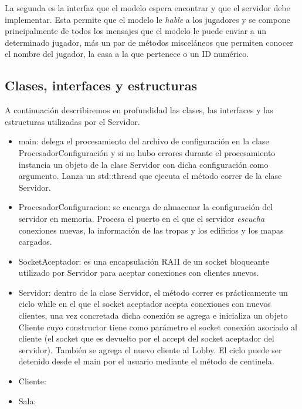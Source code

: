 \documentclass[titlepage,a4paper,12pt]{article}
\begin{document}
La segunda es la interfaz que el modelo espera encontrar y que el servidor debe implementar. Esta permite que el modelo le \textit{hable} a los jugadores y se compone principalmente de todos los mensajes que el modelo le puede enviar a un determinado jugador, más un par de métodos misceláneos que permiten conocer el nombre del jugador, la casa a la que pertenece o un ID numérico.

\subsection{Clases, interfaces y estructuras}

A continuación describiremos en profundidad las clases, las interfaces y las estructuras utilizadas por el Servidor.

\begin{itemize}

\item main: delega el procesamiento del archivo de configuración en la clase ProcesadorConfiguración y si no hubo errores durante el procesamiento instancia un objeto de la clase Servidor con dicha configuración como argumento. Lanza un std::thread que ejecuta el método correr de la clase Servidor.

\item ProcesadorConfiguracion: se encarga de almacenar la configuración del servidor en memoria. Procesa el puerto en el que el servidor \textit{escucha}  conexiones nuevas, la información de las tropas y los edificios y los mapas cargados.

\item SocketAceptador: es una encapsulación RAII de un socket bloqueante utilizado por Servidor para aceptar conexiones con clientes nuevos.

\item Servidor: dentro de la clase Servidor, el método correr es prácticamente un ciclo while en el que el socket aceptador acepta conexiones con nuevos clientes, una vez concretada dicha conexión se agrega e inicializa un objeto Cliente cuyo constructor tiene como parámetro el socket conexión asociado al cliente (el socket que es devuelto por el accept del socket aceptador del servidor). También se agrega el nuevo cliente al Lobby. El ciclo puede ser detenido desde el main por el usuario mediante el método de centinela.

\item Cliente:

\item Sala:


\end{itemize}
\end{document}
